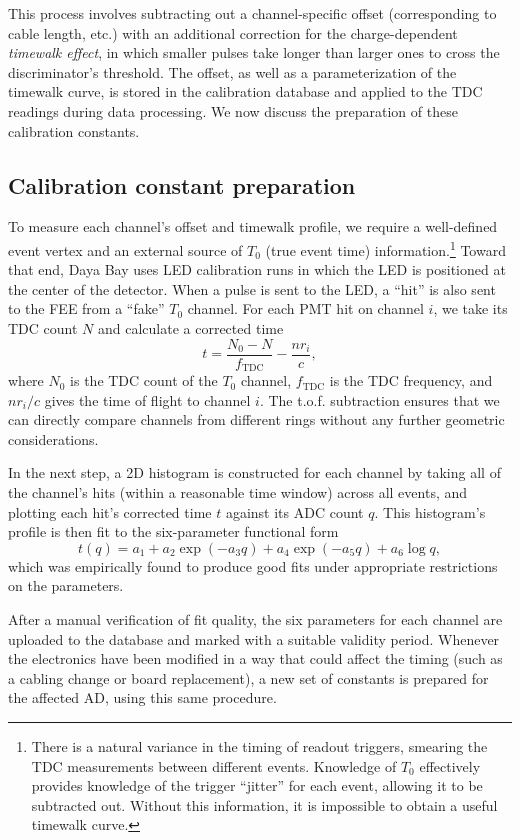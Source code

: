 \documentclass[../thesis.tex]{subfiles}
\begin{document}
This process involves subtracting out a channel-specific offset (corresponding to cable length, etc.) with an additional correction for the charge-dependent \emph{timewalk effect}, in which smaller pulses take longer than larger ones to cross the discriminator's threshold. The offset, as well as a parameterization of the timewalk curve, is stored in the calibration database and applied to the TDC readings during data processing. We now discuss the preparation of these calibration constants.

\subsection{Calibration constant preparation}

To measure each channel's offset and timewalk profile, we require a well-defined event vertex and an external source of $T_0$ (true event time) information.\footnote{There is a natural variance in the timing of readout triggers, smearing the TDC measurements between different events. Knowledge of $T_0$ effectively provides knowledge of the trigger ``jitter'' for each event, allowing it to be subtracted out. Without this information, it is impossible to obtain a useful timewalk curve.} Toward that end, Daya Bay uses LED calibration runs in which the LED is positioned at the center of the detector. When a pulse is sent to the LED, a ``hit'' is also sent to the FEE from a ``fake'' $T_0$ channel. For each PMT hit on channel $i$, we take its TDC count $N$ and calculate a corrected time
\[ t = \frac{N_0 - N}{f_\mathrm{TDC}} - \frac{n r_i}{c}, \]
where $N_0$ is the TDC count of the $T_0$ channel, $f_\mathrm{TDC}$ is the TDC frequency, and $nr_i/c$ gives the time of flight to channel $i$. The t.o.f. subtraction ensures that we can directly compare channels from different rings without any further geometric considerations.

In the next step, a 2D histogram is constructed for each channel by taking all of the channel's hits (within a reasonable time window) across all events, and plotting each hit's corrected time $t$ against its ADC count $q$. This histogram's profile is then fit to the six-parameter functional form
\[ t(q) = a_1 + a_2 \exp (-a_3 q) + a_4 \exp (-a_5 q) + a_6 \log q, \] 
which was empirically found to produce good fits under appropriate restrictions on the parameters.

After a manual verification of fit quality, the six parameters for each channel are uploaded to the database and marked with a suitable validity period. Whenever the electronics have been modified in a way that could affect the timing (such as a cabling change or board replacement), a new set of constants is prepared for the affected AD, using this same procedure.
\end{document}
